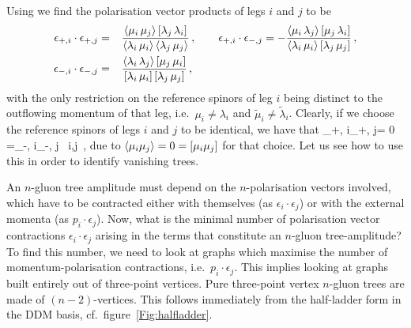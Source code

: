 Using  we find the polarisation vector products of legs $i$ and $j$ to be
\begin{align}
\epsilon_{+, i}\cdot\epsilon_{+, j}  & = \phantom{-}
\frac{\langle\mu_{i}\, \mu_{j}\rangle\, [\lambda_{j}\, \lambda_{i}]}
{\langle\lambda_{i}\, \mu_{i}\rangle\, \langle\lambda_{j}\, \mu_{j}\rangle}\, , \qquad 
\epsilon_{+, i}\cdot\epsilon_{-, j}   = -
\frac{\langle\mu_{i}\, \lambda_{j}\rangle\, [\mu_{j}\, \lambda_{i}]}
{\langle\lambda_{i}\, \mu_{i}\rangle\, [\lambda_{j}\, \mu_{j}]}\, , \nonumber\\
\epsilon_{-, i}\cdot\epsilon_{-, j}  & = \phantom{-}
\frac{\langle\lambda_{i}\, \lambda_{j}\rangle\, [\mu_{j}\, \mu_{i}]}
{[\lambda_{i}\, \mu_{i}]\, [\lambda_{j}\, \mu_{j}]}\, ,
\label{epscontr}
\end{align}
with the only restriction on the reference spinors of leg $i$ being distinct
to the outflowing momentum of that leg, i.e.~$\mu_{i}\neq \lambda_{i}$ and $\tilde\mu_{i}\neq \tilde\lambda_{i}$.  Clearly, if we choose the reference spinors of legs $i$ and $j$
to be identical, we have that
%
\be
\epsilon_{+, i}\cdot \epsilon_{+, j}= 0 =\epsilon_{-, i}\cdot \epsilon_{-, j}\qquad
\forall\, i,j\, ,
\label{uniformchoice}
\ee
due to $\langle\mu_{i}\mu_{j}\rangle=0=[\mu_{i}\mu_{j}]$ for that choice. 
Let us see how to use this in order to identify vanishing trees.

An $n$-gluon tree amplitude must depend on the $n$-polarisation vectors involved, which have to be
contracted either with themselves (as $\epsilon_{i}\cdot\epsilon_{j}$) or with the external momenta (as $p_{i}\cdot\epsilon_{j}$). 
Now, what is the minimal number of polarisation vector contractions $\epsilon_{i}\cdot\epsilon_{j}$
arising in the terms that
constitute an $n$-gluon tree-amplitude? To find this number, we need to look at graphs
which maximise the number of momentum-polarisation contractions, i.e.~$p_{i}\cdot\epsilon_{j}$. This implies looking at graphs built entirely out of
three-point vertices. Pure three-point vertex $n$-gluon trees are made of $(n-2)$-vertices.
This follows immediately from the half-ladder form in the DDM basis, cf.~figure~\ref{Fig:halfladder}.

